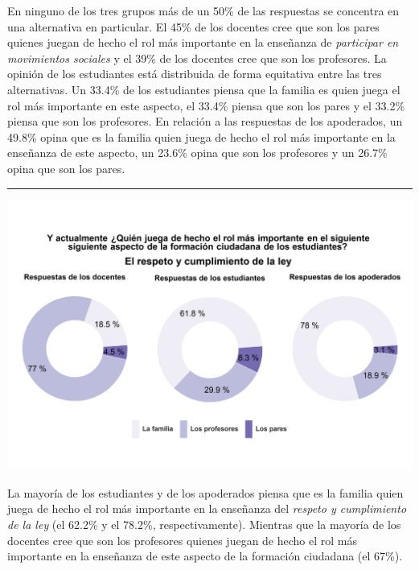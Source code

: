 \documentclass[
  14pt,
]{book}
\let\origfigure\figure
\let\endorigfigure\endfigure
\renewenvironment{figure}[1][2] {
  \expandafter\origfigure\expandafter[H]
} {
  \endorigfigure
}
\begin{document}
En ninguno de los tres grupos más de un 50\% de las respuestas se concentra en una alternativa en particular. El 45\% de los docentes cree que son los pares quienes juegan de hecho el rol más importante en la enseñanza de \emph{participar en movimientos sociales} y el 39\% de los docentes cree que son los profesores. La opinión de los estudiantes está distribuida de forma equitativa entre las tres alternativas. Un 33.4\% de los estudiantes piensa que la familia es quien juega el rol más importante en este aspecto, el 33.4\% piensa que son los pares y el 33.2\% piensa que son los profesores. En relación a las respuestas de los apoderados, un 49.8\% opina que es la familia quien juega de hecho el rol más importante en la enseñanza de este aspecto, un 23.6\% opina que son los profesores y un 26.7\% opina que son los pares.

\begin{center}\rule{0.5\linewidth}{0.5pt}\end{center}

\begin{figure}[!ht]

{\centering \includegraphics[width=0.8\linewidth,]{images/graph_for_ciud11} 

}

\caption{Quién juega el rol más importante en el cumplimiento de la ley}\label{fig:unnamed-chunk-35}
\end{figure}

La mayoría de los estudiantes y de los apoderados piensa que es la familia quien juega de hecho el rol más importante en la enseñanza del \emph{respeto y cumplimiento de la ley} (el 62.2\% y el 78.2\%, respectivamente). Mientras que la mayoría de los docentes cree que son los profesores quienes juegan de hecho el rol más importante en la enseñanza de este aspecto de la formación ciudadana (el 67\%).
\end{document}
